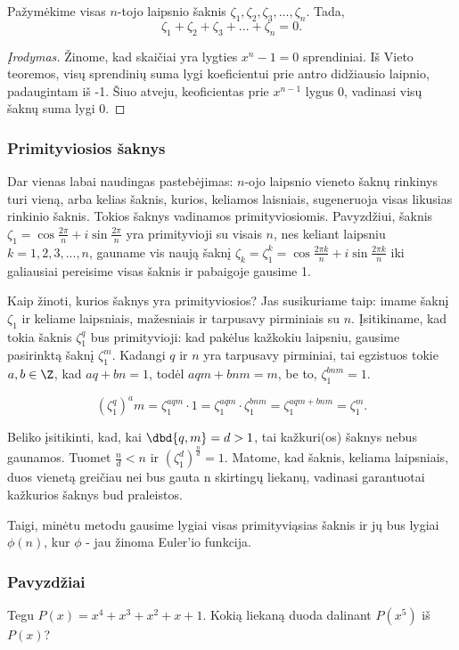 \begin{teig}
Pažymėkime visas $n$-tojo laipsnio šaknis $\zeta_1, \zeta_2, \zeta_3, ..., \zeta_n$. Tada, $$\zeta_1+\zeta_2+\zeta_3+...+\zeta_n=0.$$
\end{teig}

\begin{proof}[Įrodymas]
Žinome, kad skaičiai yra lygties $x^n-1=0$ sprendiniai. Iš Vieto teoremos, visų sprendinių suma lygi koeficientui prie antro didžiausio laipnio, padaugintam iš -1. Šiuo atveju, keoficientas prie $x^{n-1}$ lygus 0, vadinasi visų šaknų suma lygi 0. 
\end{proof}

\subsubsection{Primityviosios šaknys}

Dar vienas labai naudingas pastebėjimas: $n$-ojo laipsnio vieneto šaknų rinkinys turi vieną, arba kelias šaknis, kurios, keliamos laisniais, sugeneruoja visas likusias rinkinio šaknis. Tokios šaknys vadinamos primityviosiomis. Pavyzdžiui, šaknis $\zeta_1=\cos{\frac{2\pi}{n}}+i\sin{\frac{2\pi}{n}}$ yra primityvioji su visais $n$, nes keliant laipsniu $k=1,2,3,...,n$, gauname vis naują šaknį $\zeta_k=\zeta_1^k=\cos{\frac{2\pi k}{n}}+i\sin{\frac{2\pi k}{n}}$ iki galiausiai pereisime visas šaknis ir pabaigoje gausime 1. 

Kaip žinoti, kurios šaknys yra primityviosios? Jas susikuriame taip: imame šaknį $\zeta_1$ ir keliame laipsniais, mažesniais ir tarpusavy pirminiais su $n$. Įsitikiname, kad tokia šaknis $\zeta_1^q$ bus primityvioji: kad pakėlus kažkokiu laipsniu, gausime pasirinktą šaknį $\zeta_1^m$. Kadangi $q$ ir $n$ yra tarpusavy pirminiai, tai egzistuos tokie $a,b\in\Z$, kad $aq+bn=1$, todėl $aqm+bnm=m$, be to, $\zeta_1^{bnm}=1$. 

$$(\zeta_1^q)^am=\zeta_1^{aqm}\cdot 1=\zeta_1^{aqm}\cdot\zeta_1^{bnm}=\zeta_1^{aqm+bnm}=\zeta_1^{m}.$$ 

Beliko įsitikinti, kad, kai $\dbd{q,m}=d>1$, tai kažkuri(os) šaknys nebus gaunamos. Tuomet $\frac{n}{d}<n$ ir $(\zeta_1^{d})^{\frac{n}{d}}=1$. Matome, kad šaknis, keliama laipsniais, duos vienetą greičiau nei bus gauta n skirtingų liekanų, vadinasi garantuotai kažkurios šaknys bud praleistos. 

Taigi, minėtu metodu gausime lygiai visas primityviąsias šaknis ir jų bus lygiai $\phi(n)$, kur $\phi$ - jau žinoma Euler'io funkcija. 
\subsubsection{Pavyzdžiai}
\begin{pavnr}
Tegu $P(x)=x^4+x^3+x^2+x+1$. Kokią liekaną duoda dalinant $P(x^5)$ iš $P(x)$?
\end{pavnr}

